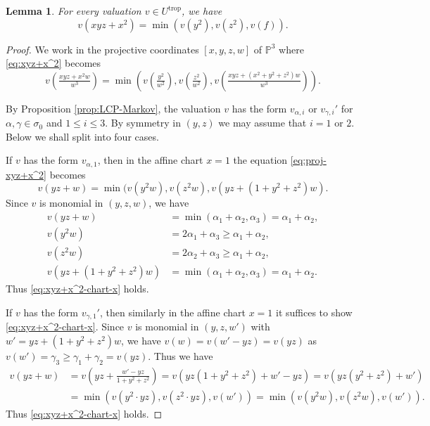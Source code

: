 \documentclass[reqno, 12pt]{amsart}
\newtheorem{lem}[prop]{Lemma}
\theoremstyle{definition}
\newcommand{\bP}{\mathbb{P}}
\newcommand{\trop}{\mathrm{trop}}
\numberwithin{equation}{section}
\begin{document}
\begin{lem}\label{lem:xyz+x^2}
For every valuation $v\in U^{\trop}$, we have 
\begin{equation}\label{eq:xyz+x^2}
v(xyz+x^2) = \min(v(y^2), v(z^2), v(f)).
\end{equation}
\end{lem}

\begin{proof}
We work in the projective coordinates $[x,y,z,w]$ of $\bP^3$ where \eqref{eq:xyz+x^2} becomes 
\begin{equation}\label{eq:proj-xyz+x^2}
    v(\tfrac{xyz+x^2 w}{w^3})  = \min(v(\tfrac{y^2}{w^2}), v(\tfrac{z^2}{w^2}), v(\tfrac{xyz+(x^2+y^2+z^2)w}{w^3})).
\end{equation}

By Proposition \ref{prop:LCP-Markov}, the valuation $v$ has the form $v_{\alpha,i}$ or $v_{\gamma,i}'$ for $\alpha,\gamma\in \sigma_0$ and $1\leq i\leq 3$. By symmetry in $(y,z)$ we may assume that $i = 1$ or $2$. Below we shall split into four cases.

If $v$ has the form $v_{\alpha,1}$, then in the affine chart $x= 1$ the equation \eqref{eq:proj-xyz+x^2} becomes 
\begin{equation}\label{eq:xyz+x^2-chart-x}
    v(yz+ w) = \min(v(y^2 w) , v(z^2 w), v(yz + (1+y^2+z^2)w).
\end{equation}
Since $v$ is monomial in $(y,z,w)$, we have 
\begin{align*}
v(yz+w) & = \min(\alpha_1+\alpha_2, \alpha_3) = \alpha_1+\alpha_2,\\
v(y^2w) & = 2\alpha_1+\alpha_3\geq \alpha_1+\alpha_2,\\
v(z^2w) & = 2\alpha_2+\alpha_3\geq \alpha_1+\alpha_2,\\
v(yz + (1+y^2+z^2)w) & =\min (\alpha_1+\alpha_2, \alpha_3) = \alpha_1+\alpha_2.
\end{align*}
Thus \eqref{eq:xyz+x^2-chart-x} holds.

If $v$ has the form $v_{\gamma,1}'$, then similarly in the affine chart $x=1$ it suffices to show \eqref{eq:xyz+x^2-chart-x}. Since $v$ is monomial in $(y,z,w')$ with $w' = yz + (1+y^2+z^2)w$, we have $v(w) = v(w'-yz) = v(yz)$ as $v(w') = \gamma_3 \geq \gamma_1+\gamma_2 = v(yz)$. Thus we have 
\begin{align*}
v(yz+w)&  = v(yz + \tfrac{w'-yz}{1+y^2+z^2}) = v(yz(1+y^2+z^2) + w' - yz) = v(yz(y^2+z^2) + w') \\
& = \min(v(y^2\cdot yz), v(z^2\cdot yz), v(w')) = \min (v(y^2 w), v(z^2 w), v(w')).
\end{align*}
Thus \eqref{eq:xyz+x^2-chart-x} holds.


\end{proof}
\end{document}
